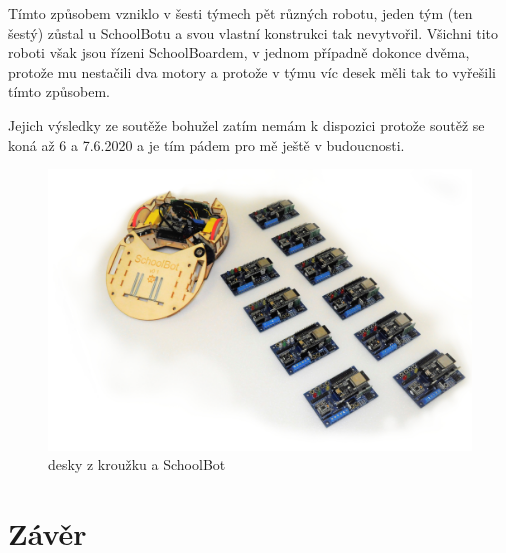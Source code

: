 \documentclass{template/socthesis}
\begin{document}
Tímto způsobem vzniklo v šesti týmech pět různých robotu, jeden tým (ten šestý) zůstal u SchoolBotu a svou vlastní konstrukci tak nevytvořil. Všichni tito roboti však jsou řízeni SchoolBoardem, v jednom případně dokonce dvěma, protože mu nestačili dva motory a protože v týmu víc desek měli tak to vyřešili tímto způsobem.

Jejich výsledky ze soutěže bohužel zatím nemám k dispozici protože soutěž se koná až 6 a 7.6.2020 a je tím pádem pro mě ještě v budoucnosti.

\begin{figure}[h]
	\centering
	\includegraphics[width=1.1\textwidth]{img/sada2.JPG}
	\caption{desky z kroužku a SchoolBot}
\end{figure}



\newpage

\chapter*{Závěr} %



\appendix
{}
	
\end{document}

